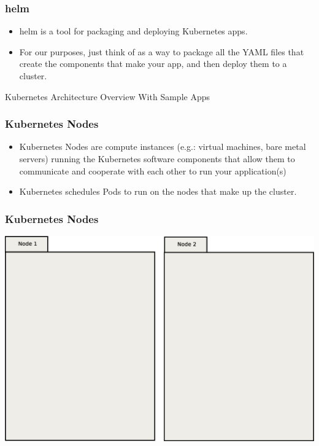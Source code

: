 \documentclass{beamer}
\begin{document}
\begin{frame}
\frametitle{helm\footnotemark}
\begin{itemize}
    \item helm is a tool for packaging and deploying Kubernetes apps.
    \item For our purposes, just think of as a way to package all the YAML files that create the components that make your app, and then deploy them to a cluster.
\end{itemize}
\end{frame}

\begin{frame}
    \begin{center}
        \Huge Kubernetes Architecture Overview With Sample Apps
    \end{center}
\end{frame}

\begin{frame}
\frametitle{Kubernetes Nodes}
\begin{itemize}
\item Kubernetes Nodes are compute instances (e.g.: virtual machines, bare metal servers) running the Kubernetes software components that allow them to communicate and cooperate with each other to run your application(s)
\item Kubernetes schedules Pods to run on the nodes that make up the cluster.
\end{itemize}
\end{frame}

\begin{frame}
    \frametitle{Kubernetes Nodes}
    \includegraphics[width=\textwidth,height=0.85\textheight,keepaspectratio]{graphics/00-nodes.eps}
\end{frame}
\end{document}
